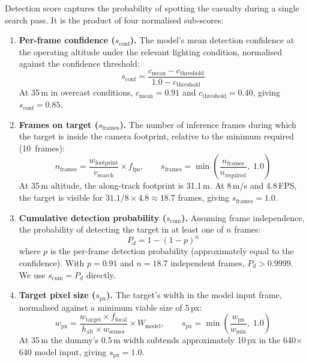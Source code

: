 \documentclass[10pt,a4paper]{article}
\begin{document}
Detection score captures the probability of spotting the casualty during a single search pass. It is the product of four normalised sub-scores:

\begin{enumerate}[nosep]
  \item \textbf{Per-frame confidence ($s_\text{conf}$).} The model's mean detection confidence at the operating altitude under the relevant lighting condition, normalised against the confidence threshold:
  \begin{equation}
    s_\text{conf} = \frac{c_\text{mean} - c_\text{threshold}}{1.0 - c_\text{threshold}}
  \end{equation}
  At 35\,m in overcast conditions, $c_\text{mean} = 0.91$ and $c_\text{threshold} = 0.40$, giving $s_\text{conf} = 0.85$.

  \item \textbf{Frames on target ($s_\text{frames}$).} The number of inference frames during which the target is inside the camera footprint, relative to the minimum required (10~frames):
  \begin{equation}
    n_\text{frames} = \frac{w_\text{footprint}}{v_\text{search}} \times f_\text{fps}, \qquad
    s_\text{frames} = \min\!\left(\frac{n_\text{frames}}{n_\text{required}},\; 1.0\right)
  \end{equation}
  At 35\,m altitude, the along-track footprint is 31.1\,m. At 8\,m/s and 4.8\,FPS, the target is visible for $31.1 / 8 \times 4.8 \approx 18.7$ frames, giving $s_\text{frames} = 1.0$.

  \item \textbf{Cumulative detection probability ($s_\text{cum}$).} Assuming frame independence, the probability of detecting the target in at least one of $n$ frames:
  \begin{equation}
    P_d = 1 - (1 - p)^n
  \end{equation}
  where $p$ is the per-frame detection probability (approximately equal to the confidence). With $p = 0.91$ and $n = 18.7$ independent frames, $P_d > 0.9999$. We use $s_\text{cum} = P_d$ directly.

  \item \textbf{Target pixel size ($s_\text{px}$).} The target's width in the model input frame, normalised against a minimum viable size of 5\,px:
  \begin{equation}
    w_\text{px} = \frac{w_\text{target} \times f_\text{focal}}{h_\text{alt} \times w_\text{sensor}} \times W_\text{model}, \qquad
    s_\text{px} = \min\!\left(\frac{w_\text{px}}{w_\text{min}},\; 1.0\right)
  \end{equation}
  At 35\,m the dummy's 0.5\,m width subtends approximately 10\,px in the 640$\times$640 model input, giving $s_\text{px} = 1.0$.
\end{enumerate}
\end{document}
